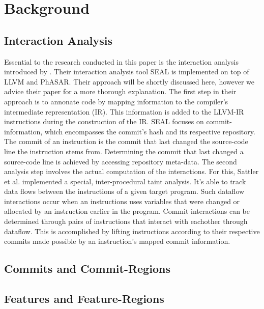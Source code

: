 \section*{Background}\label{ch:background}

\subsection*{Interaction Analysis}

Essential to the research conducted in this paper is the interaction analysis introduced by \citet{sattler2023seal}.
Their interaction analysis tool SEAL is implemented on top of LLVM and PhASAR.
Their approach will be shortly discussed here, however we advice their paper for a more thorough explanation.
The first step in their approach is to annonate code by mapping information to the compiler's intermediate representation (IR).
This information is added to the LLVM-IR instructions during the construction of the IR.
SEAL focuses on commit-information, which encompasses the commit's hash and its respective repository.
The commit of an instruction is the commit that last changed the source-code line the instruction stems from.
Determining the commit that last changed a source-code line is achieved by accessing repository meta-data.
The second analysis step involves the actual computation of the interactions.
For this, Sattler et al. implemented a special, inter-procedural taint analysis.
It's able to track data flows between the instructions of a given target program.
Such dataflow interactions occur when an instructions uses variables that were changed or allocated by an instruction earlier in the program.
Commit interactions can be determined through pairs of instructions that interact with eachother through dataflow.
This is accomplished by lifting instructions according to their respective commits made possible by an instruction's mapped commit information.

\subsection*{Commits and Commit-Regions}

\subsection*{Features and Feature-Regions}

